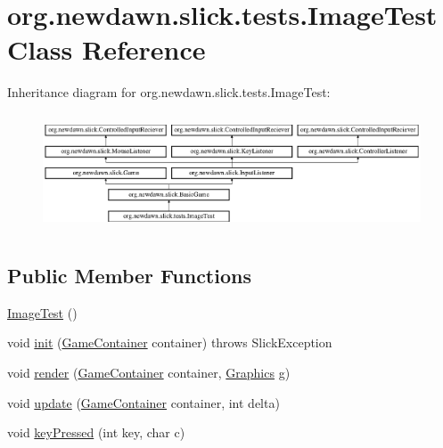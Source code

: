 \hypertarget{classorg_1_1newdawn_1_1slick_1_1tests_1_1_image_test}{}\section{org.\+newdawn.\+slick.\+tests.\+Image\+Test Class Reference}
\label{classorg_1_1newdawn_1_1slick_1_1tests_1_1_image_test}
Inheritance diagram for org.\+newdawn.\+slick.\+tests.\+Image\+Test\+:\begin{figure}[H]
\begin{center}
\leavevmode
\includegraphics[height=3.522012cm]{classorg_1_1newdawn_1_1slick_1_1tests_1_1_image_test}
\end{center}
\end{figure}
\subsection*{Public Member Functions}
\begin{DoxyCompactItemize}
\item 
\mbox{\hyperlink{classorg_1_1newdawn_1_1slick_1_1tests_1_1_image_test_a6a0fed2502d5b4cfd51e5a5a57bf5e5e}{Image\+Test}} ()
\item 
void \mbox{\hyperlink{classorg_1_1newdawn_1_1slick_1_1tests_1_1_image_test_a6b1d821ed31ee08c457a618db83ed19e}{init}} (\mbox{\hyperlink{classorg_1_1newdawn_1_1slick_1_1_game_container}{Game\+Container}} container)  throws Slick\+Exception 
\item 
void \mbox{\hyperlink{classorg_1_1newdawn_1_1slick_1_1tests_1_1_image_test_aa275b004e2f4bbfe09b5eba234a2224a}{render}} (\mbox{\hyperlink{classorg_1_1newdawn_1_1slick_1_1_game_container}{Game\+Container}} container, \mbox{\hyperlink{classorg_1_1newdawn_1_1slick_1_1_graphics}{Graphics}} g)
\item 
void \mbox{\hyperlink{classorg_1_1newdawn_1_1slick_1_1tests_1_1_image_test_a40c8ee6897cc066d46e92ce5a63eeea0}{update}} (\mbox{\hyperlink{classorg_1_1newdawn_1_1slick_1_1_game_container}{Game\+Container}} container, int delta)
\item 
void \mbox{\hyperlink{classorg_1_1newdawn_1_1slick_1_1tests_1_1_image_test_aed432b3c2a19c65bcbb759d170fdade9}{key\+Pressed}} (int key, char c)
\end{DoxyCompactItemize}

